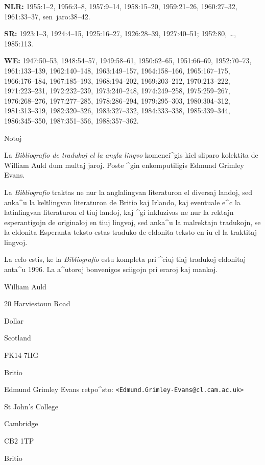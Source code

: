 \begin{flushleft}
\medskip

{\bf NLR:}
\mbox{1955:1--2},
\mbox{1956:3--8},
\mbox{1957:9--14},
\mbox{1958:15--20},
\mbox{1959:21--26},
\mbox{1960:27--32},
\mbox{1961:33--37},
\mbox{sen jaro:38--42}.

\medskip

{\bf SR:}
\mbox{1923:1--3},
\mbox{1924:4--15},
\mbox{1925:16--27},
\mbox{1926:28--39},
\mbox{1927:40--51};
\mbox{1952:80}, \ldots,
\mbox{1985:113}.

\medskip

{\bf WE:}
\mbox{1947:50--53},
\mbox{1948:54--57},
\mbox{1949:58--61},
\mbox{1950:62--65},
\mbox{1951:66--69},
\mbox{1952:70--73},
\mbox{1961:133--139},
\mbox{1962:140--148},
\mbox{1963:149--157},
\mbox{1964:158--166},
\mbox{1965:167--175},
\mbox{1966:176--184},
\mbox{1967:185--193},
\mbox{1968:194--202},
\mbox{1969:203--212},
\mbox{1970:213--222},
\mbox{1971:223--231},
\mbox{1972:232--239},
\mbox{1973:240--248},
\mbox{1974:249--258},
\mbox{1975:259--267},
\mbox{1976:268--276},
\mbox{1977:277--285},
\mbox{1978:286--294},
\mbox{1979:295--303},
\mbox{1980:304--312},
\mbox{1981:313--319},
\mbox{1982:320--326},
\mbox{1983:327--332},
\mbox{1984:333--338},
\mbox{1985:339--344},
\mbox{1986:345--350},
\mbox{1987:351--356},
\mbox{1988:357--362}.

\end{flushleft}

\begin{center}\Large
Notoj
\end{center}
\setlength{\parindent}{1cm}

La {\em Bibliografio de tradukoj el la angla lingvo} komenci^gis kiel
sliparo kolektita de William {\sc Auld} dum multaj jaroj. Poste ^gin
enkomputiligis Edmund {\sc Grimley Evans}.

La {\em Bibliografio} traktas ne nur la anglalingvan literaturon el diversaj
landoj, sed anka^u la keltlingvan literaturon de Britio kaj Irlando,
kaj eventuale e^c la latinlingvan literaturon el tiuj landoj, kaj ^gi
inkluzivas ne nur la rektajn esperantigojn de originaloj en tiuj
lingvoj, sed anka^u la malrektajn tradukojn, se la eldonita Esperanta
teksto estas traduko de eldonita teksto en iu el la traktitaj lingvoj.

La celo estis, ke la {\em Bibliografio} estu kompleta pri ^ciuj tiaj tradukoj eldonitaj
anta^u 1996. La a^utoroj bonvenigos sciigojn pri eraroj kaj mankoj.

\bigskip

William {\sc Auld}

20 Harviestoun Road

Dollar

Scotland

FK14 7HG

Britio

\bigskip

Edmund {\sc Grimley Evans}
\hfill
retpo^sto: {\tt <Edmund.Grimley-Evans@cl.cam.ac.uk>}

St John's College

Cambridge

CB2 1TP

Britio


